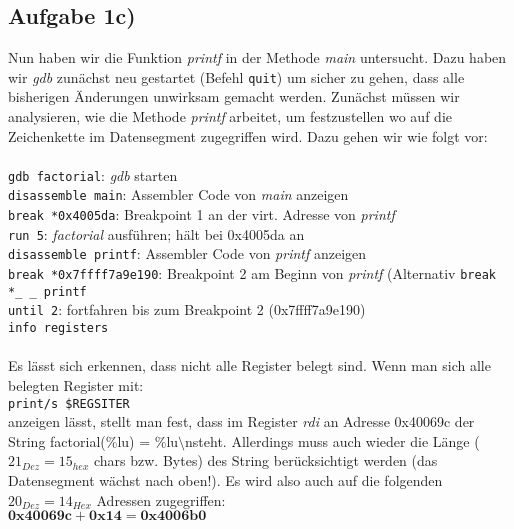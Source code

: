 \documentclass{ti2}
\begin{document}
\subsection*{Aufgabe 1c)}
Nun haben wir die Funktion \textit{printf} in der Methode \textit{main} untersucht. Dazu haben wir \textit{gdb} zunächst neu gestartet (Befehl \texttt{quit}) um sicher zu gehen, dass alle bisherigen Änderungen unwirksam gemacht werden. Zunächst müssen wir analysieren, wie die Methode \textit{printf} arbeitet, um festzustellen wo auf die Zeichenkette im Datensegment zugegriffen wird. Dazu gehen wir wie folgt vor:  \\ \\
\texttt{gdb factorial}: \textit{gdb} starten \\
\texttt{disassemble main}: Assembler Code von \textit{main} anzeigen \\
\texttt{break *0x4005da}: Breakpoint 1 an der virt. Adresse von \textit{printf} \\
\texttt{run 5}: \textit{factorial} ausführen; hält bei 0x4005da an\\
\texttt{disassemble printf}: Assembler Code von \textit{printf} anzeigen \\ 
\texttt{break *0x7ffff7a9e190}: Breakpoint 2 am Beginn von \textit{printf} (Alternativ \texttt{break *\_ \_ printf} \\
\texttt{until 2}: fortfahren bis zum Breakpoint 2 (0x7ffff7a9e190)  \\
\texttt{info registers} \\ \\
Es lässt sich erkennen, dass nicht alle Register belegt sind. Wenn man sich alle belegten Register mit: \\
\texttt{print/s \$REGSITER} \\
anzeigen lässt, stellt man fest, dass im Register \textit{rdi} an Adresse 0x40069c der String \glqq factorial(\%lu) = \%lu$\setminus$n\grqq steht. Allerdings muss auch wieder die Länge ($21_{Dez} = 15_{hex}$ chars bzw. Bytes) des String berücksichtigt werden (das Datensegment wächst nach oben!). Es wird also auch auf die folgenden $20_{Dez} = 14_{Hex}$ Adressen zugegriffen:\\
$\mathbf{0x40069c + 0x14 =  0x4006b0}$ 
\end{document}
